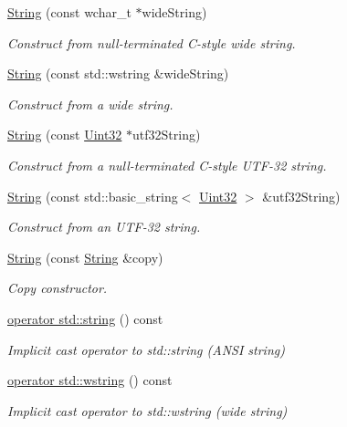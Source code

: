 \begin{DoxyCompactItemize}
\hyperlink{classsf_1_1_string_a5742d0a9b0c754f711820c2b5c40fa55}{String} (const wchar\-\_\-t $\ast$wide\-String)
\begin{DoxyCompactList}\small\item\em Construct from null-\/terminated C-\/style wide string. \end{DoxyCompactList}\item 
\hyperlink{classsf_1_1_string_a5e38151340af4f9a5f74ad24c0664074}{String} (const std\-::wstring \&wide\-String)
\begin{DoxyCompactList}\small\item\em Construct from a wide string. \end{DoxyCompactList}\item 
\hyperlink{classsf_1_1_string_aea3629adf19f9fe713d4946f6c75b214}{String} (const \hyperlink{namespacesf_aa746fb1ddef4410bddf198ebb27e727c}{Uint32} $\ast$utf32\-String)
\begin{DoxyCompactList}\small\item\em Construct from a null-\/terminated C-\/style U\-T\-F-\/32 string. \end{DoxyCompactList}\item 
\hyperlink{classsf_1_1_string_a6eee86dbe75d16bbcc26e97416c2e1ca}{String} (const std\-::basic\-\_\-string$<$ \hyperlink{namespacesf_aa746fb1ddef4410bddf198ebb27e727c}{Uint32} $>$ \&utf32\-String)
\begin{DoxyCompactList}\small\item\em Construct from an U\-T\-F-\/32 string. \end{DoxyCompactList}\item 
\hyperlink{classsf_1_1_string_af862594d3c4070d8ddbf08cf8dce4f59}{String} (const \hyperlink{classsf_1_1_string}{String} \&copy)
\begin{DoxyCompactList}\small\item\em Copy constructor. \end{DoxyCompactList}\item 
\hyperlink{classsf_1_1_string_a3664f92c3b488bf9f60f6b8eafe1844d}{operator std\-::string} () const 
\begin{DoxyCompactList}\small\item\em Implicit cast operator to std\-::string (A\-N\-S\-I string) \end{DoxyCompactList}\item 
\hyperlink{classsf_1_1_string_a20d50d45020d1dbe1779dda69ee83732}{operator std\-::wstring} () const 
\begin{DoxyCompactList}\small\item\em Implicit cast operator to std\-::wstring (wide string) \end{DoxyCompactList}\item 

\end{DoxyCompactItemize}
